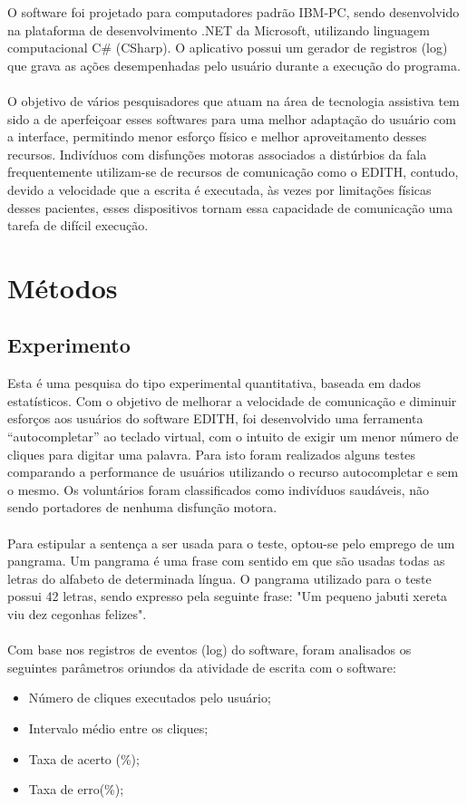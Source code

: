 \documentclass[twoside]{article}
\begin{document}
\begin{multicols}{2}
\noindent O software foi projetado para computadores padrão IBM-PC, sendo desenvolvido na plataforma de desenvolvimento .NET da Microsoft, utilizando linguagem computacional C\# (CSharp). O aplicativo possui um gerador de registros (log) que grava as ações desempenhadas pelo usuário durante a execução do programa.
\noindent \\\\O objetivo de vários pesquisadores que atuam na área de tecnologia assistiva tem sido a de aperfeiçoar esses softwares para uma melhor adaptação do usuário com a interface, permitindo menor esforço físico e melhor aproveitamento desses recursos. Indivíduos com disfunções motoras associados a distúrbios da fala frequentemente utilizam-se de recursos de comunicação como o EDITH, contudo, devido a velocidade que a escrita é executada, às vezes por limitações físicas desses pacientes, esses dispositivos tornam essa capacidade de comunicação uma tarefa de difícil execução. 

\section{Métodos}

\subsection{Experimento}
Esta é uma pesquisa do tipo experimental quantitativa, baseada em dados estatísticos. Com o objetivo de melhorar a velocidade de comunicação e diminuir esforços aos usuários do software EDITH, foi desenvolvido uma ferramenta “autocompletar” ao teclado virtual, com o intuito de exigir um menor número de cliques para digitar uma palavra. Para isto foram realizados alguns testes comparando a performance de usuários utilizando o recurso autocompletar e sem o mesmo. Os voluntários foram classificados como indivíduos saudáveis, não sendo portadores de nenhuma disfunção motora. 
\\\\
Para estipular a sentença a ser usada para o teste, optou-se pelo emprego de um pangrama. Um pangrama é uma frase com sentido em que são usadas todas as letras do alfabeto de determinada língua. O pangrama utilizado para o teste possui 42 letras, sendo expresso pela seguinte frase: "Um pequeno jabuti xereta viu dez cegonhas felizes". 
\\\\
Com base nos registros de eventos (log) do software, foram analisados os seguintes parâmetros oriundos da atividade de escrita com o software:
\begin{itemize}
\item Número de cliques executados pelo usuário;
\item Intervalo médio entre os cliques;
\item Taxa de acerto (\%);
\item Taxa de erro(\%);
\end{itemize}


\end{multicols}
\end{document}
